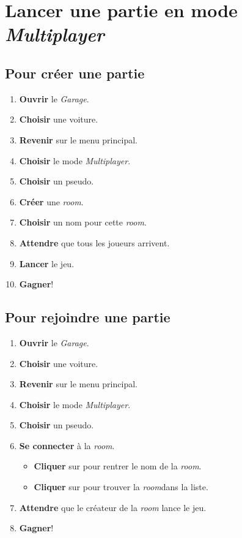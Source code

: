 \documentclass[a4paper,12pt]{article}
\newcommand\button[1]{\fbox{\texttt{#1}}}
\newcommand\room{\textsl{room}}
\begin{document}
    \section{Lancer une partie en mode \textsl{Multiplayer}}
        \subsection{Pour créer une partie}
            \begin{enumerate}
                \item \textbf{Ouvrir} le \textsl{Garage}.
                \item \textbf{Choisir} une voiture.
                \item \textbf{Revenir} sur le menu principal.
                \item \textbf{Choisir} le mode \textsl{Multiplayer}.
                \item \textbf{Choisir} un pseudo.
                \item \textbf{Créer} une \room.
                \item \textbf{Choisir} un nom pour cette \room.
                \item \textbf{Attendre} que tous les joueurs arrivent.
                \item \textbf{Lancer} le jeu.
                \item \textbf{Gagner}!
            \end{enumerate}

        \subsection{Pour rejoindre une partie}
            \begin{enumerate}
                \item \textbf{Ouvrir} le \textsl{Garage}.
                \item \textbf{Choisir} une voiture.
                \item \textbf{Revenir} sur le menu principal.
                \item \textbf{Choisir} le mode \textsl{Multiplayer}.
                \item \textbf{Choisir} un pseudo.
                \item \textbf{Se connecter} à la \room.
                    \begin{itemize}
                        \item \textbf{Cliquer} sur \button{Join}\;pour rentrer le nom de la \room.
                        \item \textbf{Cliquer} sur \button{Find}\;pour trouver la \room\;dans la liste.
                    \end{itemize}
                \item \textbf{Attendre} que le créateur de la \room\; lance le jeu.
                \item \textbf{Gagner}!
            \end{enumerate}
\end{document}
